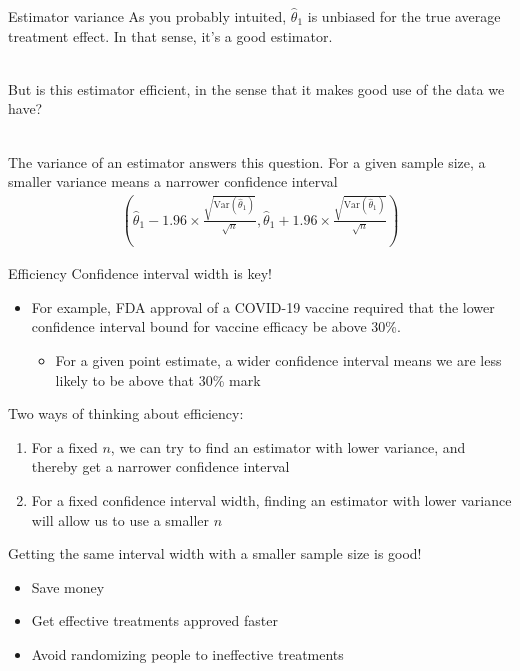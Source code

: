 \documentclass[10pt,t]{beamer}
\begin{document}
\begin{frame}{Estimator variance}
	As you probably intuited, $\hat{\theta}_1$ is unbiased for the true average treatment effect. In that sense, it's a good estimator. 
	\\ ~\ 
	
	But is this estimator efficient, in the sense that it makes good use of the data we have? 
	\\ ~\ 
	
	The variance of an estimator answers this question. For a given sample size, a smaller variance means a narrower confidence interval
	\begin{align*}
		\left(\hat{\theta}_1 - 1.96\times \frac{\sqrt{\text{Var}(\hat{\theta}_1)}}{\sqrt{n}}, \hat{\theta}_1 + 1.96\times \frac{\sqrt{\text{Var}(\hat{\theta}_1)}}{\sqrt{n}}\right)
	\end{align*} 
\end{frame}

\begin{frame}{Efficiency}
	Confidence interval width is key!
	\begin{itemize}
		\item For example, FDA approval of a COVID-19 vaccine required that the lower confidence interval bound for vaccine efficacy be above 30\%. 
		\begin{itemize}
			\item For a given point estimate, a wider confidence interval means we are less likely to be above that 30\% mark
		\end{itemize}
	\end{itemize}
	Two ways of thinking about efficiency:
	\begin{enumerate}
		\item For a fixed $n$, we can try to find an estimator with lower variance, and thereby get a narrower confidence interval
		\item For a fixed confidence interval width, finding an estimator with lower variance will allow us to use a smaller $n$
	\end{enumerate}
	Getting the same interval width with a smaller sample size is good!
	\begin{itemize}
		\item Save money
		\item Get effective treatments approved faster
		\item Avoid randomizing people to ineffective treatments
	\end{itemize}
\end{frame}
\end{document}
